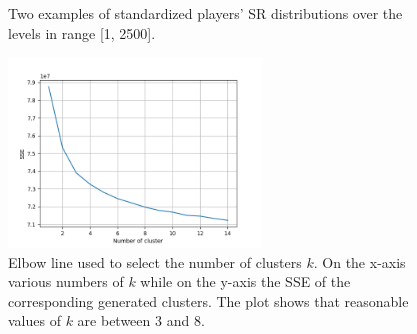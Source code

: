 \begin{figure}[h]
  \centering
    \caption{Two examples of standardized players' SR distributions over the levels in range [1, 2500]. 
    }
    \label{fig:player_distribution}
\end{figure}
\begin{figure}[h!]
  \centering
    \includegraphics[width=0.6\textwidth]{masters-thesis-master/masters-thesis/contents/04_results/clustering_players_images/select_k.png}
    \caption{Elbow line used to select the number of clusters $k$. On the x-axis various numbers of $k$ while on the y-axis the SSE of the corresponding generated clusters. The plot shows that reasonable values of $k$ are between 3 and 8.}
    \label{fig:select_k}
\end{figure}
